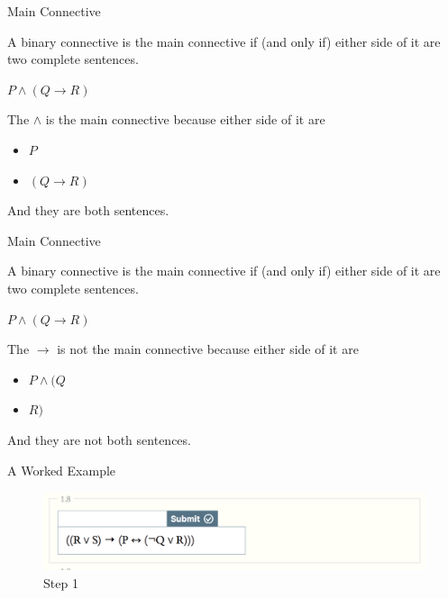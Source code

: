 \documentclass[
  ignorenonframetext,
]{beamer}
\providecommand{\tightlist}{%
  \setlength{\itemsep}{0pt}\setlength{\parskip}{0pt}}
\renewcommand{\,}{\text{, }}
\renewenvironment*{quote}	
	{\list{}{\rightmargin   \leftmargin} \item } 	
	{\endlist }
\begin{document}
\begin{frame}{Main Connective}
\protect\hypertarget{main-connective-1}{}

A binary connective is the main connective if (and only if) either side
of it are two complete sentences.

\begin{quote}
\(P \wedge (Q \rightarrow R)\)
\end{quote}

The \(\wedge\) is the main connective because either side of it are

\begin{itemize}
\tightlist
\item
  \(P\)
\item
  \((Q \rightarrow R)\)
\end{itemize}

And they are both sentences.

\end{frame}

\begin{frame}{Main Connective}
\protect\hypertarget{main-connective-2}{}

A binary connective is the main connective if (and only if) either side
of it are two complete sentences.

\begin{quote}
\(P \wedge (Q \rightarrow R)\)
\end{quote}

The \(\rightarrow\) is not the main connective because either side of it
are

\begin{itemize}
\tightlist
\item
  \(P \wedge (Q\)
\item
  \(R)\)
\end{itemize}

And they are not both sentences.

\end{frame}

\begin{frame}{A Worked Example}
\protect\hypertarget{a-worked-example}{}

\begin{figure}
\centering
\includegraphics{../images/class02/1.png}
\caption{Step 1}
\end{figure}

\end{frame}
\end{document}

